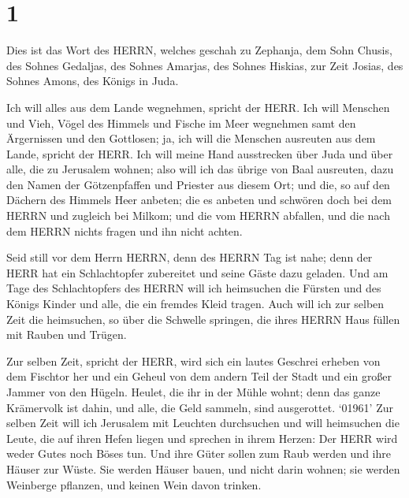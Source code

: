 \hypertarget{section}{%
\section{1}\label{section}}

 Dies ist das Wort des HERRN, welches geschah zu Zephanja,
dem Sohn Chusis, des Sohnes Gedaljas, des Sohnes Amarjas, des Sohnes
Hiskias, zur Zeit Josias, des Sohnes Amons, des Königs in Juda.

 Ich will alles aus dem Lande wegnehmen, spricht der HERR.
 Ich will Menschen und Vieh, Vögel des Himmels und Fische im
Meer wegnehmen samt den Ärgernissen und den Gottlosen; ja, ich will die
Menschen ausreuten aus dem Lande, spricht der HERR.  Ich
will meine Hand ausstrecken über Juda und über alle, die zu Jerusalem
wohnen; also will ich das übrige von Baal ausreuten, dazu den Namen der
Götzenpfaffen und Priester aus diesem Ort;  und die, so auf
den Dächern des Himmels Heer anbeten; die es anbeten und schwören doch
bei dem HERRN und zugleich bei Milkom;  und die vom HERRN
abfallen, und die nach dem HERRN nichts fragen und ihn nicht achten.

 Seid still vor dem Herrn HERRN, denn des HERRN Tag ist
nahe; denn der HERR hat ein Schlachtopfer zubereitet und seine Gäste
dazu geladen.  Und am Tage des Schlachtopfers des HERRN will
ich heimsuchen die Fürsten und des Königs Kinder und alle, die ein
fremdes Kleid tragen.  Auch will ich zur selben Zeit die
heimsuchen, so über die Schwelle springen, die ihres HERRN Haus füllen
mit Rauben und Trügen.

 Zur selben Zeit, spricht der HERR, wird sich ein lautes
Geschrei erheben von dem Fischtor her und ein Geheul von dem andern Teil
der Stadt und ein großer Jammer von den Hügeln.  Heulet,
die ihr in der Mühle wohnt; denn das ganze Krämervolk ist dahin, und
alle, die Geld sammeln, sind ausgerottet.  `01961' Zur
selben Zeit will ich Jerusalem mit Leuchten durchsuchen und will
heimsuchen die Leute, die auf ihren Hefen liegen und sprechen in ihrem
Herzen: Der HERR wird weder Gutes noch Böses tun.  Und ihre
Güter sollen zum Raub werden und ihre Häuser zur Wüste. Sie werden
Häuser bauen, und nicht darin wohnen; sie werden Weinberge pflanzen, und
keinen Wein davon trinken.

